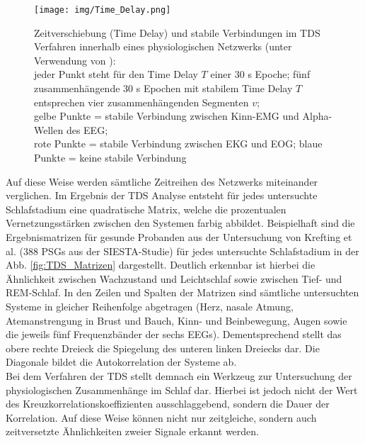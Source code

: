 \begin{figure}[H]
	\centering
	\texttt{[image: img/Time\_Delay.png]}
	\caption[Zeitverschiebung (Time Delay) und stabile Verbindungen im \acs{TDS} Verfahren]{Zeitverschiebung (Time Delay) und stabile Verbindungen im \acs{TDS} Verfahren innerhalb eines physiologischen Netzwerks (unter Verwendung von \parencite{bashan_network_2012}):\\jeder Punkt steht für den Time Delay $T$ einer 30 s Epoche; fünf zusammenhängende 30 s Epochen mit stabilem Time Delay $T$ entsprechen vier zusammenhängenden Segmenten $v$;\\gelbe Punkte = stabile Verbindung zwischen Kinn-\acs{EMG} und Alpha-Wellen des \acs{EEG};\\rote Punkte = stabile Verbindung zwischen \acs{EKG} und \acs{EOG}; blaue Punkte = keine stabile Verbindung}
	\label{fig:TimeDelay}
\end{figure}

Auf diese Weise werden sämtliche Zeitreihen des Netzwerks miteinander verglichen. Im Ergebnis der \acs{TDS} Analyse entsteht für jedes untersuchte Schlafstadium eine quadratische Matrix, welche die prozentualen Vernetzungsstärken zwischen den Systemen farbig abbildet. Beispielhaft sind die Ergebnismatrizen für gesunde Probanden aus der Untersuchung von Krefting et al. \parencite{krefting_altersabhangigkeit_2016} (388 \acs{PSG}s aus der SIESTA-Studie) für jedes untersuchte Schlafstadium in der Abb. \ref{fig:TDS_Matrizen} dargestellt. Deutlich erkennbar ist hierbei die Ähnlichkeit zwischen Wachzustand und Leichtschlaf sowie zwischen Tief- und \acs{REM}-Schlaf. In den Zeilen und Spalten der Matrizen sind sämtliche untersuchten Systeme in gleicher Reihenfolge abgetragen (Herz, nasale Atmung, Atemanstrengung in Brust und Bauch, Kinn- und Beinbewegung, Augen sowie die jeweils fünf Frequenzbänder der sechs \acs{EEG}s). Dementsprechend stellt das obere rechte Dreieck die Spiegelung des unteren linken Dreiecks dar. Die Diagonale bildet die Autokorrelation der Systeme ab.\\

Bei dem Verfahren der TDS stellt demnach ein Werkzeug zur Untersuchung der physiologischen Zusammenhänge im Schlaf dar. Hierbei ist jedoch nicht der Wert des Kreuzkorrelationskoeffizienten ausschlaggebend, sondern die Dauer der Korrelation. Auf diese Weise können nicht nur zeitgleiche, sondern auch zeitversetzte Ähnlichkeiten zweier Signale erkannt werden. \parencite{bashan_network_2012}

